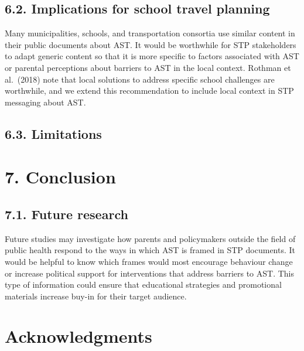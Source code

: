 \documentclass[]{elsarticle} %
\begin{document}
\hypertarget{implications-for-school-travel-planning}{%
\subsection{6.2. Implications for school travel
planning}\label{implications-for-school-travel-planning}}

Many municipalities, schools, and transportation consortia use similar
content in their public documents about AST. It would be worthwhile for
STP stakeholders to adapt generic content so that it is more specific to
factors associated with AST or parental perceptions about barriers to
AST in the local context. Rothman et al.~(2018) note that local
solutions to address specific school challenges are worthwhile, and we
extend this recommendation to include local context in STP messaging
about AST.

\hypertarget{limitations}{%
\subsection{6.3. Limitations}\label{limitations}}

\hypertarget{conclusion}{%
\section{7. Conclusion}\label{conclusion}}

\hypertarget{future-research}{%
\subsection{7.1. Future research}\label{future-research}}

Future studies may investigate how parents and policymakers outside the
field of public health respond to the ways in which AST is framed in STP
documents. It would be helpful to know which frames would most encourage
behaviour change or increase political support for interventions that
address barriers to AST. This type of information could ensure that
educational strategies and promotional materials increase buy-in for
their target audience.

\hypertarget{acknowledgments}{%
\section{Acknowledgments}\label{acknowledgments}}
\end{document}
